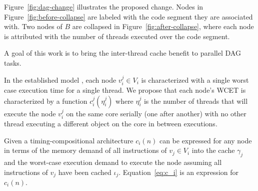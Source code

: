 Figure~\ref{fig:dag-change} illustrates the proposed change. Nodes in
Figure~\ref{fig:before-collapse} are labeled with the code segment
they are associated with. Two nodes of ${B}$ are collapsed in
Figure~\ref{fig:after-collapse}, where each node is attributed with
the number of threads executed over the code segment.

A goal of this work is to bring the inter-thread cache benefit \addcite to parallel DAG tasks. 


In the established model \addcite, each node ${v_i^j \in V_i}$ is characterized
with a single worst case execution time for a single thread. We
propose that each node's WCET is characterized by a function
${c_i^j(\eta_i^j)}$ where ${\eta_i^j}$ is the number of threads that will execute the
node ${v_i^j}$ on the same core serially (one after another) with no
other thread executing a different object on the core in between executions.

Given a timing-compositional architecture
${c_i(n)}$ can be expressed for any node in terms of the memory demand of all instructions
of ${v_j \in V_i}$ into the cache ${\gamma_j}$ and the worst-case execution demand
to execute the node assuming all instructions of ${v_j}$ have
been cached ${\iota_j}$. Equation~\ref{eq:c_i} is an expression for
${c_i(n)}$. 
 

